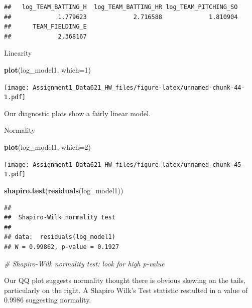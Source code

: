 \documentclass[
]{article}
\newenvironment{Shaded}{\begin{snugshade}}{\end{snugshade}}
\newcommand{\AttributeTok}[1]{\textcolor[rgb]{0.13,0.29,0.53}{#1}}
\newcommand{\CommentTok}[1]{\textcolor[rgb]{0.56,0.35,0.01}{\textit{#1}}}
\newcommand{\DecValTok}[1]{\textcolor[rgb]{0.00,0.00,0.81}{#1}}
\newcommand{\FunctionTok}[1]{\textcolor[rgb]{0.13,0.29,0.53}{\textbf{#1}}}
\newcommand{\NormalTok}[1]{#1}
\begin{document}
\begin{verbatim}
##   log_TEAM_BATTING_H  log_TEAM_BATTING_HR log_TEAM_PITCHING_SO 
##             1.779623             2.716588             1.810904 
##      TEAM_FIELDING_E 
##             2.368167
\end{verbatim}

Linearity

\begin{Shaded}
\begin{Highlighting}[]
\FunctionTok{plot}\NormalTok{(log\_model1, }\AttributeTok{which=}\DecValTok{1}\NormalTok{)}
\end{Highlighting}
\end{Shaded}

\texttt{[image: Assignment1\_Data621\_HW\_files/figure-latex/unnamed-chunk-44-1.pdf]}

Our diagnostic plots show a fairly linear model.

Normality

\begin{Shaded}
\begin{Highlighting}[]
\FunctionTok{plot}\NormalTok{(log\_model1, }\AttributeTok{which=}\DecValTok{2}\NormalTok{)}
\end{Highlighting}
\end{Shaded}

\texttt{[image: Assignment1\_Data621\_HW\_files/figure-latex/unnamed-chunk-45-1.pdf]}

\begin{Shaded}
\begin{Highlighting}[]
\FunctionTok{shapiro.test}\NormalTok{(}\FunctionTok{residuals}\NormalTok{(log\_model1))}
\end{Highlighting}
\end{Shaded}

\begin{verbatim}
## 
##  Shapiro-Wilk normality test
## 
## data:  residuals(log_model1)
## W = 0.99862, p-value = 0.1927
\end{verbatim}

\begin{Shaded}
\begin{Highlighting}[]
\CommentTok{\# Shapiro{-}Wilk normality test: look for high p{-}value}
\end{Highlighting}
\end{Shaded}

Our QQ plot suggests normality thought there is obvious skewing on the
tails, particularly on the right. A Shapiro Wilk's Test statistic
restulted in a value of 0.9986 suggesting normality.
\end{document}
